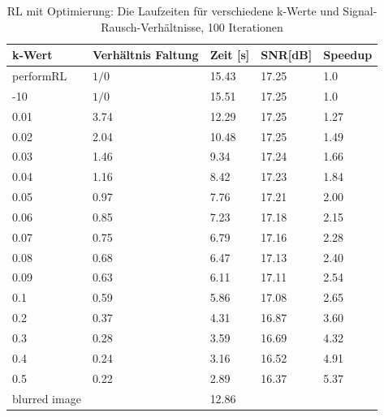 \documentclass[a4paper,12pt]{article}
\begin{document}
\begin{table}[h]
\begin{center}
\begin{tabular}{ | l | l | l | l | l |}
\hline
k-Wert 				 &	Verhältnis Faltung 	& Zeit [s] & SNR[dB] & Speedup \\ \hline
performRL		 	 & 		$1/0$			& 	15.43 & 17.25& 	1.0 	\\ \hline
-10 			 	 & 		$1/0$			& 	15.51 & 17.25& 	1.0 	\\ \hline
0.01				 & 		3.74			&	12.29 & 17.25    &  1.27\\
0.02				 & 		2.04			&	10.48 & 17.25    & 	1.49\\
0.03				 & 		1.46			&	9.34  & 17.24    & 	1.66\\
0.04				 &		1.16			&	8.42  & 17.23    & 	1.84\\
0.05				 & 		0.97			&	7.76  & 17.21    & 	2.00\\
0.06				 & 		0.85			&	7.23  & 17.18    & 	2.15\\ 
0.07				 & 		0.75			&	6.79  & 17.16    & 	2.28\\
0.08				 & 		0.68			&	6.47  & 17.13    & 	2.40\\
0.09				 & 		0.63			&	6.11  & 17.11    & 	2.54\\
0.1					 & 		0.59			&	5.86  & 17.08    & 	2.65\\
0.2					 &		0.37			&	4.31  & 16.87    & 	3.60\\
0.3					 &		0.28			&	3.59  & 16.69    & 	4.32\\
0.4					 & 		0.24			& 	  3.16  & 16.52    & 	4.91\\
0.5					 & 		0.22			&	2.89  & 16.37    & 	5.37\\ \hline
                     
blurred image	&		  & 12.86 & \\
\hline
\end{tabular}
\caption{RL mit Optimierung: Die Laufzeiten für verschiedene k-Werte und
Signal-Rausch-Verhältnisse, 100 Iterationen}
\label{tab:konv_time_SNR_RL}
\end{center}
\end{table}
\end{document}
